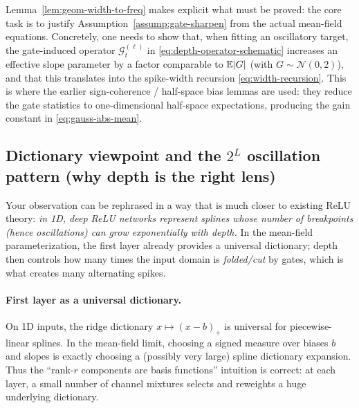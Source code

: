\begin{remark}
Lemma~\ref{lem:geom-width-to-freq} makes explicit what must be proved:
the core task is to justify Assumption~\ref{assump:gate-sharpen} from the actual mean-field equations.
Concretely, one needs to show that, when fitting an oscillatory target, the gate-induced operator $\mathcal{G}^{(\ell)}_t$ in \eqref{eq:depth-operator-schematic} increases an effective slope parameter by a factor comparable to $\mathbb{E}|G|$ (with $G\sim\mathcal{N}(0,2)$), and that this translates into the spike-width recursion \eqref{eq:width-recursion}.
This is where the earlier sign-coherence / half-space bias lemmas are used: they reduce the gate statistics to one-dimensional half-space expectations, producing the gain constant in \eqref{eq:gauss-abs-mean}.
\end{remark}

\subsection{Dictionary viewpoint and the $2^L$ oscillation pattern (why depth is the right lens)}

Your observation can be rephrased in a way that is much closer to existing ReLU theory:
\emph{in 1D, deep ReLU networks represent splines whose number of breakpoints (hence oscillations) can grow exponentially with depth.}
In the mean-field parameterization, the first layer already provides a universal dictionary; depth then controls how many times the input domain is \emph{folded/cut} by gates, which is what creates many alternating spikes.

\paragraph{First layer as a universal dictionary.}
On 1D inputs, the ridge dictionary $x\mapsto (x-b)_+$ is universal for piecewise-linear splines.
In the mean-field limit, choosing a signed measure over biases $b$ and slopes is exactly choosing a (possibly very large) spline dictionary expansion.
Thus the ``rank-$r$ components are basis functions'' intuition is correct: at each layer, a small number of channel mixtures selects and reweights a huge underlying dictionary.

